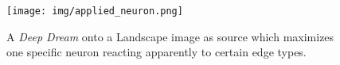 \begin{figure}[H]
	\centering
	\texttt{[image: img/applied\_neuron.png]}
	\caption{A \textit{Deep Dream} onto a Landscape image as source which maximizes one specific neuron reacting apparently to certain edge types.}
	\label{fig:applieddream}
\end{figure}

